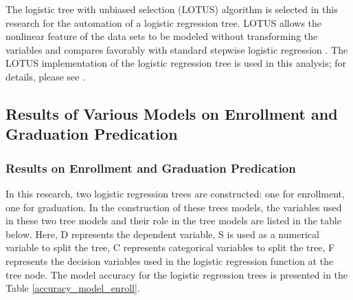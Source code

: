 \documentclass[12pt,english]{report}
\begin{document}
The logistic tree with unbiased selection (LOTUS) algorithm \citep{lotus2}  is 
selected in this research for the automation of a logistic regression tree. 
LOTUS allows the nonlinear feature of the data sets to be modeled without 
transforming the variables and compares favorably with standard stepwise 
logistic regression \citep{lotus_app1,lotus_app2}.
The LOTUS implementation of the logistic regression tree is used in this 
analysis; for details, please see \citep{lotus2}.


\subsection{Results of Various Models on Enrollment and Graduation Predication}
\subsubsection{Results on Enrollment and Graduation Predication}

In this research, two logistic regression trees are constructed: one for 
enrollment, one for graduation.  In the construction of these trees models, 
the variables used in these two tree models and their role in the tree models 
are listed in the table below. Here, D represents the dependent variable, S is 
used as a numerical variable to split the tree, C represents categorical 
variables to split the tree, F represents the decision variables used in the 
logistic regression function at the tree node. The model accuracy for the 
logistic regression trees is presented in the Table
\ref{accuracy_model_enroll}.
\end{document}

